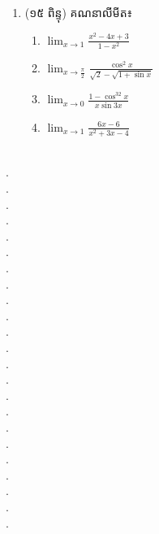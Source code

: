\documentclass{officialexam}
\begin{document}
	{\maketitle}
	\begin{enumerate}[I]
		\item {\color{khtug}(១៥ ពិន្ទុ)} គណនាលីមីត៖
		\begin{enumerate}[k,4]
			\item $\lim_{x\to1}\frac{x^2-4x+3}{1-x^2}$
			\item $\lim_{x\to\frac{\pi}{2}}\frac{\cos^2x}{\sqrt{2}-\sqrt{1+\sin x}}$
			\item $\lim_{x\to0}\frac{1-\cos^32x}{x\sin3x}$
			\item $\lim_{x\to1}\frac{6x-6}{x^2+3x-4}$
		\end{enumerate}
	\end{enumerate}
\\
{\color{white}.}\dotfill\\
{\color{white}.}\dotfill\\
{\color{white}.}\dotfill
\\
{\color{white}.}\dotfill\\
{\color{white}.}\dotfill\\
{\color{white}.}\dotfill
\\
{\color{white}.}\dotfill\\
{\color{white}.}\dotfill\\
{\color{white}.}\dotfill
\\
{\color{white}.}\dotfill\\
{\color{white}.}\dotfill\\
{\color{white}.}\dotfill
\\
{\color{white}.}\dotfill\\
{\color{white}.}\dotfill\\
{\color{white}.}\dotfill
\\
{\color{white}.}\dotfill\\
{\color{white}.}\dotfill\\
{\color{white}.}\dotfill
\\
{\color{white}.}\dotfill\\
{\color{white}.}\dotfill\\
{\color{white}.}\dotfill
\\
{\color{white}.}\dotfill\\
{\color{white}.}\dotfill
\end{document}

